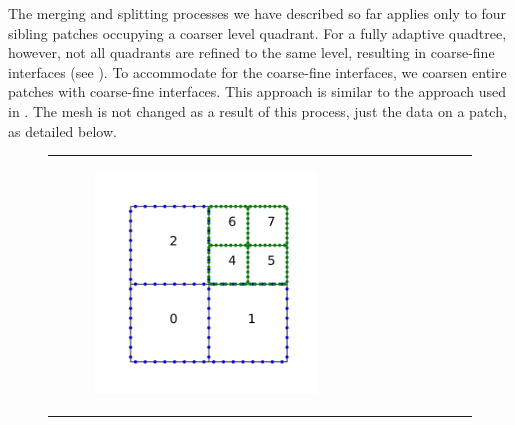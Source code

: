 The merging and splitting processes we have described so far applies only to four sibling patches occupying a coarser level quadrant. For a fully adaptive quadtree, however, not all quadrants are refined to the same level, resulting in coarse-fine interfaces (see ). To accommodate for the coarse-fine interfaces, we coarsen entire patches with coarse-fine interfaces. This approach is similar to the approach used in \citep{babb2018accelerated}. The mesh is not changed as a result of this process, just the data on a patch, as detailed below.

\begin{figure}
    \centering
    \begin{tabular}{ccc}
        \begin{subfigure}[t]{0.3\textwidth}
            \centering
            \includegraphics[width=\textwidth, clip=true, trim={100 150 100 150}]{figures/adaptive_merge1.pdf}
        \end{subfigure}
        &
        \begin{subfigure}[t]{0.3\textwidth}
            \centering

\end{subfigure}
\end{tabular}
\end{figure}
